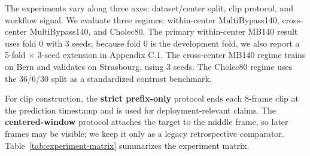 The experiments vary along three axes: dataset/center split, clip
protocol, and workflow signal. We evaluate three regimes: within-center
MultiBypass140, cross-center MultiBypass140, and Cholec80. The primary
within-center MB140 result uses fold 0 with 3 seeds; because fold 0 is
the development fold, we also report a 5-fold \(\times\) 3-seed
extension in Appendix C.1. The cross-center MB140 regime trains on Bern
and validates on Strasbourg, using 3 seeds. The Cholec80 regime uses the
36/6/30 split as a standardized contrast benchmark.

For clip construction, the \textbf{strict prefix-only} protocol ends each
8-frame clip at the prediction timestamp and is used for
deployment-relevant claims. The \textbf{centered-window} protocol
attaches the target to the middle frame, so later frames may be visible;
we keep it only as a legacy retrospective comparator. Table~\ref{tab:experiment-matrix} summarizes the experiment matrix.

